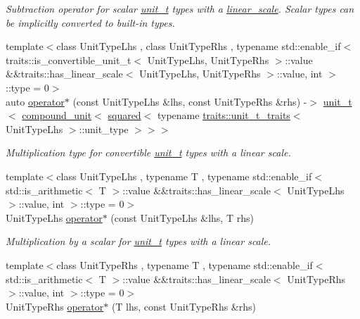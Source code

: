 \begin{DoxyCompactItemize}
\begin{DoxyCompactList}\small\item\em Subtraction operator for scalar \hyperlink{classunits_1_1unit__t}{unit\+\_\+t} types with a \hyperlink{structunits_1_1linear__scale}{linear\+\_\+scale}. Scalar types can be implicitly converted to built-\/in types. \end{DoxyCompactList}\item 
{\footnotesize template$<$class Unit\+Type\+Lhs , class Unit\+Type\+Rhs , typename std\+::enable\+\_\+if$<$ traits\+::is\+\_\+convertible\+\_\+unit\+\_\+t$<$ Unit\+Type\+Lhs, Unit\+Type\+Rhs $>$\+::value \&\&traits\+::has\+\_\+linear\+\_\+scale$<$ Unit\+Type\+Lhs, Unit\+Type\+Rhs $>$\+::value, int $>$\+::type  = 0$>$ }\\auto \hyperlink{namespaceunits_a3d67221c61e6c955fb24dd97053cb0ba}{operator$\ast$} (const Unit\+Type\+Lhs \&lhs, const Unit\+Type\+Rhs \&rhs) -\/$>$ \hyperlink{classunits_1_1unit__t}{unit\+\_\+t}$<$ \hyperlink{group___unit_types_ga9c3f6f077dc894620e1ed8358442a8f1}{compound\+\_\+unit}$<$ \hyperlink{group___unit_manipulators_ga636346f7898c35eb98a796bec1d77fb2}{squared}$<$ typename \hyperlink{structunits_1_1traits_1_1unit__t__traits}{traits\+::unit\+\_\+t\+\_\+traits}$<$ Unit\+Type\+Lhs $>$\+::unit\+\_\+type $>$$>$$>$
\begin{DoxyCompactList}\small\item\em Multiplication type for convertible \hyperlink{classunits_1_1unit__t}{unit\+\_\+t} types with a linear scale. \end{DoxyCompactList}\item 
\hypertarget{namespaceunits_a1331b4001873d72d2720c91c9466f62f}{}{\footnotesize template$<$class Unit\+Type\+Lhs , typename T , typename std\+::enable\+\_\+if$<$ std\+::is\+\_\+arithmetic$<$ T $>$\+::value \&\&traits\+::has\+\_\+linear\+\_\+scale$<$ Unit\+Type\+Lhs $>$\+::value, int $>$\+::type  = 0$>$ }\\Unit\+Type\+Lhs \hyperlink{namespaceunits_a1331b4001873d72d2720c91c9466f62f}{operator$\ast$} (const Unit\+Type\+Lhs \&lhs, T rhs)\label{namespaceunits_a1331b4001873d72d2720c91c9466f62f}

\begin{DoxyCompactList}\small\item\em Multiplication by a scalar for \hyperlink{classunits_1_1unit__t}{unit\+\_\+t} types with a linear scale. \end{DoxyCompactList}\item 
\hypertarget{namespaceunits_a89703f136d140a037e83d384b868e326}{}{\footnotesize template$<$class Unit\+Type\+Rhs , typename T , typename std\+::enable\+\_\+if$<$ std\+::is\+\_\+arithmetic$<$ T $>$\+::value \&\&traits\+::has\+\_\+linear\+\_\+scale$<$ Unit\+Type\+Rhs $>$\+::value, int $>$\+::type  = 0$>$ }\\Unit\+Type\+Rhs \hyperlink{namespaceunits_a89703f136d140a037e83d384b868e326}{operator$\ast$} (T lhs, const Unit\+Type\+Rhs \&rhs)\label{namespaceunits_a89703f136d140a037e83d384b868e326}


\end{DoxyCompactItemize}
